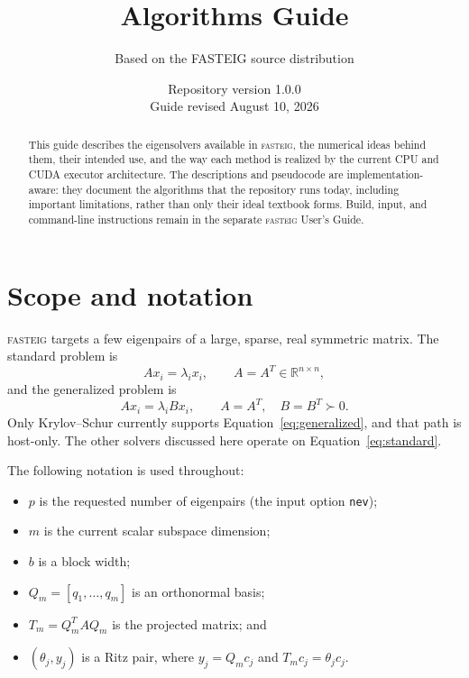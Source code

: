 \documentclass[11pt]{article}
\title{\fasteig{} Algorithms Guide}
\author{Based on the FASTEIG source distribution}
\date{Repository version 1.0.0\\Guide revised August 10, 2026}
\newcommand{\fasteig}{\textsc{fasteig}}
\newcommand{\code}[1]{\texttt{#1}}
\newcommand{\RR}{\mathbb{R}}
\begin{document}
\setlength{\emergencystretch}{3em}
\maketitle

\begin{abstract}
This guide describes the eigensolvers available in \fasteig{}, the numerical
ideas behind them, their intended use, and the way each method is realized by
the current CPU and CUDA executor architecture.  The descriptions and
pseudocode are implementation-aware: they document the algorithms that the
repository runs today, including important limitations, rather than only their
ideal textbook forms.  Build, input, and command-line instructions remain in
the separate \fasteig{} User's Guide.
\end{abstract}

\tableofcontents
\newpage

\section{Scope and notation}

\fasteig{} targets a few eigenpairs of a large, sparse, real symmetric matrix.
The standard problem is
\begin{equation}
  A x_i = \lambda_i x_i, \qquad A=A^T\in\RR^{n\times n},
  \label{eq:standard}
\end{equation}
and the generalized problem is
\begin{equation}
  A x_i = \lambda_i Bx_i, \qquad A=A^T,\quad B=B^T\succ 0.
  \label{eq:generalized}
\end{equation}
Only Krylov--Schur currently supports Equation~\eqref{eq:generalized}, and that
path is host-only.  The other solvers discussed here operate on
Equation~\eqref{eq:standard}.

The following notation is used throughout:
\begin{itemize}[leftmargin=*]
  \item $p$ is the requested number of eigenpairs (the input option
        \code{nev});
  \item $m$ is the current scalar subspace dimension;
  \item $b$ is a block width;
  \item $Q_m=[q_1,\ldots,q_m]$ is an orthonormal basis;
  \item $T_m=Q_m^TAQ_m$ is the projected matrix; and
  \item $(\theta_j,y_j)$ is a Ritz pair, where $y_j=Q_m c_j$ and
        $T_m c_j=\theta_j c_j$.
\end{itemize}
\end{document}
